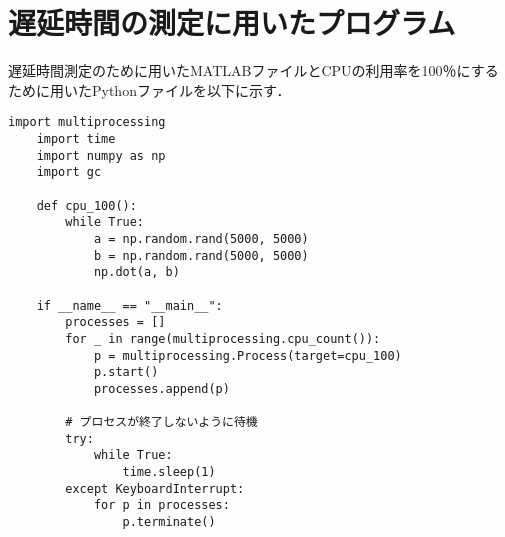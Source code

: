 \chapter{遅延時間の測定に用いたプログラム}
遅延時間測定のために用いたMATLABファイルとCPUの利用率を100％にするために用いたPythonファイルを以下に示す．

\begin{lstlisting}[caption=cpu100.py]
    import multiprocessing
    import time
    import numpy as np
    import gc

    def cpu_100():
        while True:
            a = np.random.rand(5000, 5000)
            b = np.random.rand(5000, 5000)
            np.dot(a, b)

    if __name__ == "__main__":
        processes = []
        for _ in range(multiprocessing.cpu_count()):
            p = multiprocessing.Process(target=cpu_100)
            p.start()
            processes.append(p)

        # プロセスが終了しないように待機
        try:
            while True:
                time.sleep(1)
        except KeyboardInterrupt:
            for p in processes:
                p.terminate()

\end{lstlisting}
    
